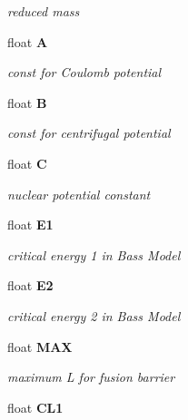 \begin{CompactItemize}
\begin{CompactList}\small\item\em reduced mass \item\end{CompactList}\item 
float \bf{A}\label{classCFus_d09ce136c0dc5ac594d56e6e4667ce1f}

\begin{CompactList}\small\item\em const for Coulomb potential \item\end{CompactList}\item 
float \bf{B}\label{classCFus_ababfd265386064471c1acee2e7b3866}

\begin{CompactList}\small\item\em const for centrifugal potential \item\end{CompactList}\item 
float \bf{C}\label{classCFus_22f58afbb76205e58818ba8e2ca375f0}

\begin{CompactList}\small\item\em nuclear potential constant \item\end{CompactList}\item 
float \bf{E1}\label{classCFus_54b190863f0edc422597e1175ebf790f}

\begin{CompactList}\small\item\em critical energy 1 in Bass Model \item\end{CompactList}\item 
float \bf{E2}\label{classCFus_1a1d56a40bdce0409d98d9b903eb2249}

\begin{CompactList}\small\item\em critical energy 2 in Bass Model \item\end{CompactList}\item 
float \bf{MAX}\label{classCFus_2df5f8cac70125f94e4c92d2ef1b8aea}

\begin{CompactList}\small\item\em maximum L for fusion barrier \item\end{CompactList}\item 
float \bf{CL1}\label{classCFus_cbb29a3669384e5492f87f0d26e3f79a}


\end{CompactItemize}

